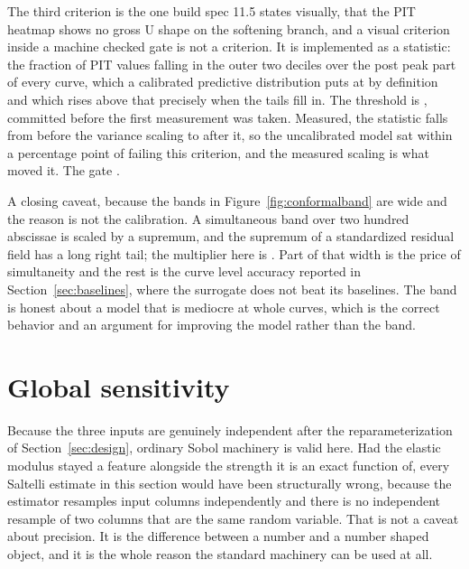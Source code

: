 \documentclass[11pt,a4paper]{article}
\begin{document}
The third criterion is the one build spec 11.5 states visually, that the PIT heatmap shows no
gross U shape on the softening branch, and a visual criterion inside a machine checked gate is
not a criterion. It is implemented as a statistic: the fraction of PIT values falling in the
outer two deciles over the post peak part of every curve, which a calibrated predictive
distribution puts at \PitOuterMassNominal{} by definition and which rises above that precisely
when the tails fill in. The threshold is \PitOuterMassMax{}, committed before the first
measurement was taken. Measured, the statistic falls from \PitOuterMassBefore{} before the
variance scaling to \PitOuterMassAfter{} after it, so the uncalibrated model sat within a
percentage point of failing this criterion, and the measured scaling is what moved it. The gate
\CalibrationGatePassed{}.

A closing caveat, because the bands in Figure~\ref{fig:conformalband} are wide and the reason is
not the calibration. A simultaneous band over two hundred abscissae is scaled by a supremum, and
the supremum of a standardized residual field has a long right tail; the multiplier here is
\BandForceScale{}. Part of that width is the price of simultaneity and the rest is the curve
level accuracy reported in Section~\ref{sec:baselines}, where the surrogate does not beat its
baselines. The band is honest about a model that is mediocre at whole curves, which is the
correct behavior and an argument for improving the model rather than the band.

\section{Global sensitivity}
\label{sec:sensitivity}
Because the three inputs are genuinely independent after the reparameterization of
Section~\ref{sec:design}, ordinary Sobol machinery is valid here. Had the elastic modulus
stayed a feature alongside the strength it is an exact function of, every Saltelli estimate in
this section would have been structurally wrong, because the estimator resamples input columns
independently and there is no independent resample of two columns that are the same random
variable. That is not a caveat about precision. It is the difference between a number and a
number shaped object, and it is the whole reason the standard machinery can be used at all.
\end{document}
